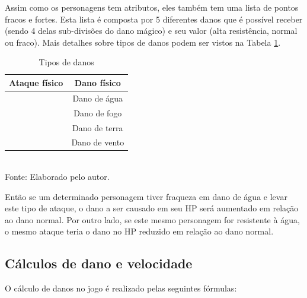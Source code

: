 \documentclass[
	12pt,					%
	openright,				%
	oneside,				%
	a4paper,				%
	bibjustif,				%
	chapter=TITLE,			%
	english,				%
	brazil,					%
	]{abntex2}
\newcommand{\source}[1]{\small Fonte: {#1}}
\begin{document}
	Assim como os personagens tem atributos,
	eles também tem uma lista de pontos fracos e fortes.
	Esta lista é composta por 5 diferentes danos que é possível receber
	(sendo 4 delas sub-divisões do dano mágico)
	e seu valor (alta resistência, normal ou fraco).
	Mais detalhes sobre tipos de danos podem ser vistos na Tabela \ref{tab:damageTypes}.
	
	\begin{table}[h]
		\caption{Tipos de danos}
		\centering
		\small
		\renewcommand{\arraystretch}{1.2} %
		\begin{tabular}{>{\centering\arraybackslash}c|c}
			\hline 
			Ataque físico & Dano físico \\ 
			\hline 
			\multirow{4}{*}{Ataque mágico (elemental)}	& Dano de água \\\cline{2-2}
														& Dano de fogo \\\cline{2-2}
														& Dano de terra \\\cline{2-2}
														& Dano de vento \\
			\hline 
		\end{tabular}\\
		\vspace{3mm}
		\source{Elaborado pelo autor.}
		\label{tab:damageTypes}
	\end{table}
	
	Então se um determinado personagem tiver fraqueza em dano de água e levar este tipo de ataque,
	o dano a ser causado em seu HP será aumentado em relação ao dano normal.
	Por outro lado, se este mesmo personagem for resistente à água,
	o mesmo ataque teria o dano no HP reduzido em relação ao dano normal.
	
	\subsection{Cálculos de dano e velocidade}
	
	O cálculo de danos no jogo é realizado pelas seguintes fórmulas:
	
\end{document}

